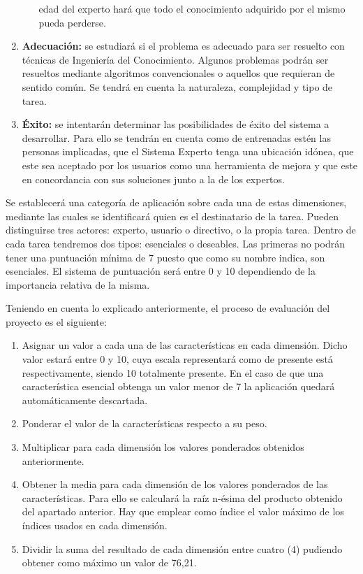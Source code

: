 \begin{enumerate}
\begin{itemize}
        edad del experto hará que todo el conocimiento adquirido por el mismo pueda perderse.
    \end{itemize}
  \item \textbf{Adecuación:} se estudiará si el problema es adecuado para ser resuelto con técnicas
    de Ingeniería del Conocimiento. Algunos problemas podrán ser resueltos mediante algoritmos convencionales
    o aquellos que requieran de sentido común. Se tendrá en cuenta la naturaleza, complejidad
    y tipo de tarea.
  \item \textbf{Éxito:} se intentarán determinar las posibilidades de éxito del sistema a desarrollar. Para
    ello se tendrán en cuenta como de entrenadas estén las personas implicadas, que el Sistema Experto tenga
    una ubicación idónea, que este sea aceptado por los usuarios como una herramienta de mejora y que este en
    concordancia con sus soluciones junto a la de los expertos.
\end{enumerate}

Se establecerá una categoría de aplicación sobre cada una de estas dimensiones,
mediante las cuales se identificará quien es el destinatario de la tarea.
Pueden distinguirse tres actores: experto, usuario o directivo, o la propia tarea.
Dentro de cada tarea tendremos dos tipos: esenciales o deseables. Las primeras no
podrán tener una puntuación mínima de 7 puesto que como su nombre indica, son esenciales.
El sistema de puntuación será entre 0 y 10 dependiendo de la importancia relativa de la misma.

Teniendo en cuenta lo explicado anteriormente, el proceso de evaluación del proyecto es el siguiente:

\begin{enumerate}
  \item Asignar un valor a cada una de las características en cada dimensión. Dicho valor estará
    entre 0 y 10, cuya escala representará como de presente está respectivamente, siendo 10 totalmente
    presente. En el caso de que una característica esencial obtenga un valor menor de 7 la aplicación
    quedará automáticamente descartada.
  \item Ponderar el valor de la características respecto a su peso.
  \item Multiplicar para cada dimensión los valores ponderados obtenidos anteriormente.
  \item Obtener la media para cada dimensión de los valores ponderados de las características.
    Para ello se calculará la raíz n-ésima del producto obtenido del apartado anterior. Hay que
    emplear como índice el valor máximo de los índices usados en cada dimensión.
  \item Dividir la suma del resultado de cada dimensión entre cuatro (4) pudiendo obtener como máximo
    un valor de 76,21.
\end{enumerate}

